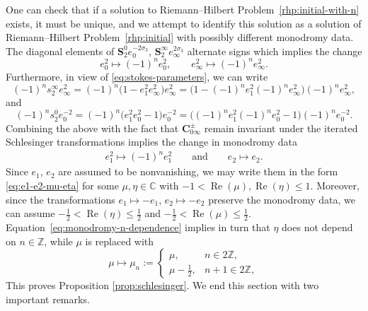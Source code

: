 \documentclass[pdftex]{sigma}
\numberwithin{equation}{section}
\newcommand{\C}{{\mathbb{C}}}
\newcommand{\Z}{{\mathbb{Z}}}
\newcommand{\re}{\operatorname{Re}}
\begin{document}
One can check that if a solution to Riemann--Hilbert Problem~\ref{rhp:initial-with-n} exists, it must be unique, and we attempt to identify this solution as a solution of Riemann--Hilbert Problem~\ref{rhp:initial} with possibly different monodromy data. The diagonal elements of $\mathbf{S}_2^0 e_0^{-2\sigma_3}$, $\mathbf{S}_2^\infty e_\infty^{2\sigma_3}$ alternate signs which implies the change
\[
e_0^2 \mapsto (-1)^n e_0^2, \qquad e_\infty^2 \mapsto (-1)^n e_\infty^2.
\]
Furthermore, in view of \eqref{eq:stokes-parameters}, we can write
\[
(-1)^n s_2^\infty e_\infty^2 = (-1)^n\big(1 - e_1^2 e_\infty^2\big) e_\infty^2 = \big(1 - (-1)^ne_1^2(-1)^ne_\infty^2\big)(-1)^ne_\infty^2,
\]
and
\[
(-1)^n s_2^0 e_0^{-2} = (-1)^n\big(e_1^2 e_0^2 - 1\big) e_0^{-2} = \big((-1)^ne_1^2(-1)^ne_0^2 -1\big)(-1)^ne_0^{-2}.
\]
Combining the above with the fact that $\mathbf{C}_{0 \infty}^\pm$ remain invariant under the iterated Schlesinger transformations implies the change in monodromy data
\begin{gather} \label{eq:monodromy-n-dependence}
e_1^2 \mapsto (-1)^ne_1^2 \qquad \text{and} \qquad e_2 \mapsto e_2.
\end{gather}
Since $e_1$, $e_2$ are assumed to be nonvanishing, we may write them in the form \eqref{eq:e1-e2-mu-eta}
for some ${\mu, \eta \in \C}$ with $-1 < \re(\mu), \re(\eta) \leq 1$. Moreover, since the transformations $e_1\mapsto-e_1$, ${e_2\mapsto -e_2}$ preserve the monodromy data, we can assume $-\frac{1}{2}<\re(\eta)\le\frac{1}{2}$ and $-\frac{1}{2}<\re(\mu) \leq \frac{1}{2}$. Equation~\eqref{eq:monodromy-n-dependence} implies in turn that $\eta$ does not depend on $n \in \Z$, while $\mu$ is replaced with
\begin{equation}
\label{eq:mu-n}
\mu \mapsto \mu_n := \begin{cases} \mu, & n \in 2\Z, \\ \mu-\frac{1}{2}, & n +1 \in 2\Z, \end{cases}
\end{equation}
This proves Proposition \ref{prop:schlesinger}. We end this section with two important remarks.
\end{document}
